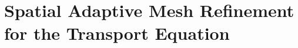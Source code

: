 \documentclass[preprint,review,10pt]{elsarticle}
\begin{document}
\section{Spatial Adaptive Mesh Refinement for the Transport Equation} \label{app::AMR}
\end{document}

